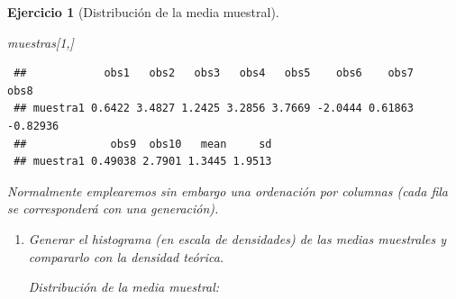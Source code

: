 \documentclass[
  spanish,
  10pt,
]{book}
\newenvironment{Shaded}{\begin{snugshade}}{\end{snugshade}}
\newcommand{\AttributeTok}[1]{\textcolor[rgb]{0.13,0.29,0.53}{#1}}
\newcommand{\CommentTok}[1]{\textcolor[rgb]{0.56,0.35,0.01}{\textit{#1}}}
\newcommand{\ConstantTok}[1]{\textcolor[rgb]{0.56,0.35,0.01}{#1}}
\newcommand{\DecValTok}[1]{\textcolor[rgb]{0.00,0.00,0.81}{#1}}
\newcommand{\FunctionTok}[1]{\textcolor[rgb]{0.13,0.29,0.53}{\textbf{#1}}}
\newcommand{\NormalTok}[1]{#1}
\newcommand{\SpecialCharTok}[1]{\textcolor[rgb]{0.81,0.36,0.00}{\textbf{#1}}}
\newcommand{\StringTok}[1]{\textcolor[rgb]{0.31,0.60,0.02}{#1}}
\theoremstyle{break}
\newtheorem{exercise}{Ejercicio}[chapter]
\theoremstyle{nonumberplain}
\renewcommand{\CommentTok}[1]{\textcolor[rgb]{0.41,0.41,0.41}{\texttt{#1}}}
\begin{document}
\begin{exercise}[Distribución de la media muestral]
\begin{enumerate}
\begin{Shaded}
\begin{Highlighting}[]
\NormalTok{muestras[}\DecValTok{1}\NormalTok{,]}
\end{Highlighting}
\end{Shaded}

\begin{verbatim}
 ##            obs1   obs2   obs3   obs4   obs5    obs6    obs7     obs8
 ## muestra1 0.6422 3.4827 1.2425 3.2856 3.7669 -2.0444 0.61863 -0.82936
 ##             obs9  obs10   mean     sd
 ## muestra1 0.49038 2.7901 1.3445 1.9513
\end{verbatim}
\end{enumerate}

Normalmente emplearemos sin embargo una ordenación por columnas (cada fila se corresponderá con una generación).

\begin{enumerate}
\def\labelenumi{\alph{enumi})}
\setcounter{enumi}{1}
\item
  Generar el histograma (en escala de densidades) de las medias
  muestrales y compararlo con la densidad teórica.

  Distribución de la media muestral:

\begin{Shaded}
\end{Shaded}


\end{enumerate}
\end{exercise}
\end{document}
